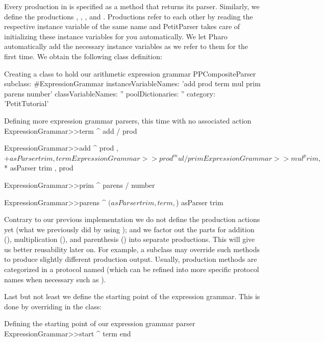 \documentclass[a4paper,10pt,twoside]{book}
\begin{document}
Every production in  is specified as a method
that returns its parser. Similarly, we define the productions
, , , and . Productions refer to
each other by reading the respective instance variable of the same
name and PetitParser takes care of initializing these instance variables
for you automatically. We let Pharo automatically add the necessary
instance variables as we refer to them for the first time. We obtain
the following class definition:

\begin{script}{Creating a class to hold our arithmetic expression grammar}
PPCompositeParser subclass: #ExpressionGrammar
   instanceVariableNames: 'add prod term mul prim parens number'
   classVariableNames: ''
   poolDictionaries: ''
   category: 'PetitTutorial'
\end{script}

\begin{script}{Defining more expression grammar parsers, this time with no associated action}
ExpressionGrammar>>term
   ^ add / prod

ExpressionGrammar>>add
   ^ prod , $+ asParser trim , term

ExpressionGrammar>>prod
   ^ mul / prim

ExpressionGrammar>>mul
   ^ prim , $* asParser trim , prod

ExpressionGrammar>>prim
   ^ parens / number

ExpressionGrammar>>parens
   ^ $( asParser trim , term , $) asParser trim
\end{script}

Contrary to our previous implementation we do not define the
production actions yet (what we previously did by using
\ppmthind{==>}); and we factor out the parts for addition (),
multiplication (), and parenthesis () into separate
productions. This will give us better reusability later on. For
example, a subclass may override such methods to produce slightly
different production output. Usually, production methods are
categorized in a protocol named  (which can be refined
into more specific protocol names when necessary such as
).

Last but not least we define the starting point of the expression
grammar. This is done by overriding
 in the 
class:

\begin{script}{Defining the starting point of our expression grammar parser}
ExpressionGrammar>>start
   ^ term end
\end{script}
\end{document}

